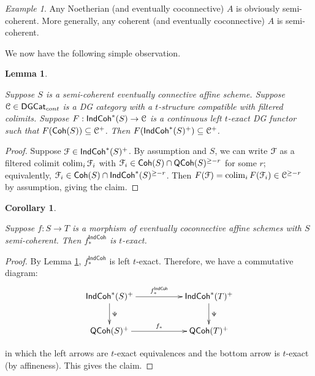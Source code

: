 \documentclass[reqno,11pt]{amsart}
\numberwithin{equation}{subsection}
\newtheorem{cor}[thm]{Corollary}
\newtheorem{lem}[thm]{Lemma}
\theoremstyle{remark}
\newtheorem{example}[thm]{Example}
\newcommand{\sC}{{\EuScript C}}
\newcommand{\sF}{{\EuScript F}}
\newcommand{\on}{\operatorname}
\newcommand{\colim}{\on{colim}}
\newcommand{\DGCat}{\mathsf{DGCat}}
\newcommand{\Coh}{\mathsf{Coh}}
\newcommand{\IndCoh}{\mathsf{IndCoh}}
\newcommand{\QCoh}{\mathsf{QCoh}}
\renewcommand{\subset}{\subseteq}
\begin{document}
\begin{example}

Any Noetherian (and eventually coconnective) 
$A$ is obviously semi-coherent. More generally, any 
coherent (and eventually coconnective) $A$ is semi-coherent.

\end{example}

We now have the following simple observation.

\begin{lem}\label{l:semi-coh-functor}

Suppose $S$ is a semi-coherent eventually connective affine scheme.
Suppose $\sC \in \DGCat_{cont}$ is a DG category with a $t$-structure
compatible with filtered colimits.  
Suppose $F:\IndCoh^*(S) \to \sC$ is a continuous left $t$-exact DG functor 
such that $F(\Coh(S)) \subset \sC^+$.
Then $F(\IndCoh^*(S)^+) \subset \sC^+$.

\end{lem}

\begin{proof}

Suppose $\sF \in \IndCoh^*(S)^+$. By assumption and $S$, we can write
$\sF$ as a filtered colimit $\colim_i \sF_i$ with 
$\sF_i \in \Coh(S) \cap \QCoh(S)^{\geq -r}$ for
some $r$; equivalently, $\sF_i \in \Coh(S) \cap \IndCoh^*(S)^{\geq -r}$.
Then $F(\sF) = \colim_i F(\sF_i) \in \sC^{\geq -r}$ by assumption, giving
the claim.

\end{proof}

\begin{cor}\label{c:semi-coh-push}

Suppose $f:S \to T$ is a morphism of eventually coconnective affine schemes
with $S$ semi-coherent. Then $f_*^{\IndCoh}$ is $t$-exact.

\end{cor}

\begin{proof}

By Lemma \ref{l:semi-coh-functor}, $f_*^{\IndCoh}$ is left $t$-exact.
Therefore, we have a commutative diagram:
%
\[
\xymatrix{
\IndCoh^*(S)^+ \ar[rr]^{f_*^{\IndCoh}} \ar[d]^{\Psi} &&  \IndCoh^*(T)^+\ar[d]^{\Psi} \\
\QCoh(S)^+ \ar[rr]^{f_*} && \QCoh(T)^+
}
\]

\noindent in which the left arrows are $t$-exact equivalences and the
bottom arrow is $t$-exact (by affineness). This gives the claim.

\end{proof}
\end{document}
